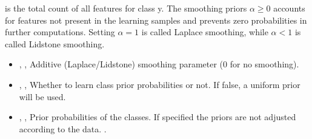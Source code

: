 is the total count of all features for class y.
%
The smoothing priors $\alpha \ge 0$ accounts for features not present in the
learning samples and prevents zero probabilities in further computations.
%
Setting $\alpha = 1$ is called Laplace smoothing, while $\alpha < 1$ is called
Lidstone smoothing.
%
\begin{itemize}
  \item {}, ,
  Additive (Laplace/Lidstone) smoothing parameter (0 for no smoothing).
  \item {}, ,
  Whether to learn class prior probabilities or not.
  If false, a uniform prior will be used.
  \item {}, ,
  Prior probabilities of the classes.
  If specified the priors are not adjusted according to the data.
  .
\end{itemize}

